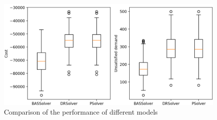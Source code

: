 \documentclass[12pt, letterpaper]{article}
\begin{document}
	\begin{figure}[h!]
	\includegraphics[width=\textwidth]{../figure/comparision.png}
	\caption{Comparison of the performance of different models}
		\label{fig:comparison}		
	\end{figure}

	\newpage
	\printglossary[type=\acronymtype]
	
	\clearpage
	
	
\end{document}
